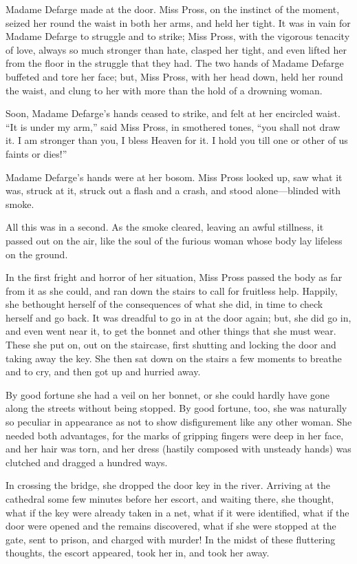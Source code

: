 Madame Defarge made at the door.  Miss Pross, on the instinct of the
moment, seized her round the waist in both her arms, and held her
tight. It was in vain for Madame Defarge to struggle and to strike;
Miss Pross, with the vigorous tenacity of love, always so much
stronger than hate, clasped her tight, and even lifted her from the
floor in the struggle that they had.  The two hands of Madame Defarge
buffeted and tore her face; but, Miss Pross, with her head down, held
her round the waist, and clung to her with more than the hold of a
drowning woman.

Soon, Madame Defarge's hands ceased to strike, and felt at her
encircled waist.  ``It is under my arm,'' said Miss Pross, in smothered
tones, ``you shall not draw it.  I am stronger than you, I bless
Heaven for it.  I hold you till one or other of us faints or dies!''

Madame Defarge's hands were at her bosom.  Miss Pross looked up, saw
what it was, struck at it, struck out a flash and a crash, and stood
alone---blinded with smoke.

All this was in a second.  As the smoke cleared, leaving an awful
stillness, it passed out on the air, like the soul of the furious
woman whose body lay lifeless on the ground.

In the first fright and horror of her situation, Miss Pross passed
the body as far from it as she could, and ran down the stairs to call
for fruitless help.  Happily, she bethought herself of the
consequences of what she did, in time to check herself and go back.
It was dreadful to go in at the door again; but, she did go in, and
even went near it, to get the bonnet and other things that she must
wear.  These she put on, out on the staircase, first shutting and
locking the door and taking away the key.  She then sat down on the
stairs a few moments to breathe and to cry, and then got up and
hurried away.

By good fortune she had a veil on her bonnet, or she could hardly
have gone along the streets without being stopped.  By good fortune,
too, she was naturally so peculiar in appearance as not to show
disfigurement like any other woman.  She needed both advantages, for
the marks of gripping fingers were deep in her face, and her hair was
torn, and her dress (hastily composed with unsteady hands) was
clutched and dragged a hundred ways.

In crossing the bridge, she dropped the door key in the river.
Arriving at the cathedral some few minutes before her escort, and
waiting there, she thought, what if the key were already taken in a
net, what if it were identified, what if the door were opened and the
remains discovered, what if she were stopped at the gate, sent to
prison, and charged with murder!  In the midst of these fluttering
thoughts, the escort appeared, took her in, and took her away.


